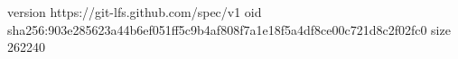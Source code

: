 version https://git-lfs.github.com/spec/v1
oid sha256:903e285623a44b6ef051ff5c9b4af808f7a1e18f5a4df8ce00c721d8c2f02fc0
size 262240
